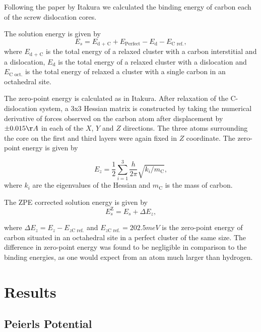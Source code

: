 \documentclass[a4paper,11pt]{article}
\begin{document}
Following the paper by Itakura
\cite{itakura13_effec_hydrog_atoms_screw_disloc} we calculated the
binding energy of carbon each of the screw dislocation cores. 

The solution energy is given by 
\[ E_s = E_{\text{d + C}} + E_{\text{Perfect}}- E_{\text{d}} - E_{\text{C ref.}}, \]
where \(E_{\text{d + C}}\) is the total energy of a relaxed cluster with a
carbon interstitial and a dislocation, \(E_{\text{d}}\) is the total
energy of a relaxed cluster with a dislocation and \(E_{\text{C
    oct.}}\) is the total energy of relaxed a cluster with a single carbon in
an octahedral site.

The zero-point energy is calculated as in Itakura. After relaxation of the
C-dislocation system, a 3x3 Hessian matrix is constructed by taking the
numerical derivative of forces observed on the carbon atom after
displacement by \(\pm 0.015 \AA\) in each of the \(X\), \(Y\) and \(Z\) directions.
The three atoms surrounding the core on the first and third layers were
again fixed in \(Z\) coordinate. The zero-point energy is
given by

\[ E_z = \frac{1}{2} \sum_{i=1}^3 \frac{h}{2\pi} \sqrt{ k_i /
    m_{\text{C}} },  \]
where \(k_i\) are the eigenvalues of the Hessian and \(m_\text{C}\) is
the mass of carbon. 

The ZPE corrected solution energy is given by 
\[ E^{\text{Z}}_{s} = E_s + \Delta E_z,  \]

where \(\Delta E_z = E_z - E_{z\text{C ref.}}\) and \(E_{z\text{C ref.}} = 202.5 meV\) is the zero-point energy of carbon
situated in an octahedral site in a perfect cluster of the same size. The difference in
zero-point energy was found to be negligible in comparison to the binding energies, as one would
expect from an atom much larger than hydrogen. 



\section{Results}
\label{sec:orga092f71}

\subsection{Peierls Potential}
\label{sec:org5aa6bf7}
\end{document}

